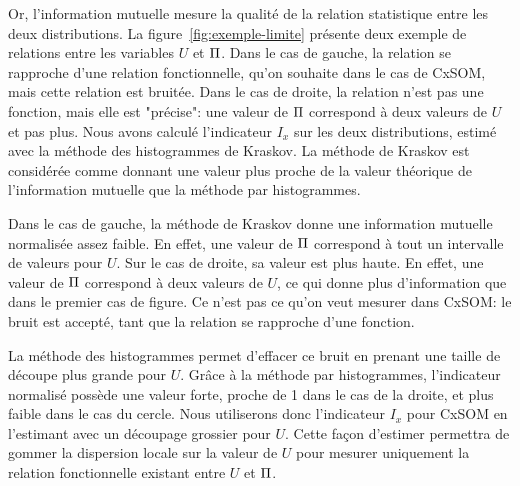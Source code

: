 Or, l'information mutuelle mesure la qualité de la relation statistique entre les deux distributions. La figure~\ref{fig:exemple-limite} présente deux exemple de relations entre les variables $U$ et $\Pi$. Dans le cas de gauche, la relation se rapproche d'une relation fonctionnelle, qu'on souhaite dans le cas de CxSOM, mais cette relation est bruitée. Dans le cas de droite, la relation n'est pas une fonction, mais elle est "précise": une valeur de $\Pi$ correspond à deux valeurs de $U$ et pas plus.
Nous avons calculé l'indicateur $I_x$ sur les deux distributions, estimé avec la méthode des histogrammes de Kraskov. La méthode de Kraskov est considérée comme donnant une valeur plus proche de la valeur théorique de l'information mutuelle que la méthode par histogrammes. 

Dans le cas de gauche, la méthode de Kraskov donne une information mutuelle normalisée assez faible. En effet, une valeur de $\Pi$ correspond à tout un intervalle de valeurs pour $U$. Sur le cas de droite, sa valeur est plus haute. En effet, une valeur de $\Pi$ correspond à deux valeurs de $U$, ce qui donne plus d'information que dans le premier cas de figure. Ce n'est pas ce qu'on veut mesurer dans CxSOM: le bruit est accepté, tant que la relation se rapproche d'une fonction.


La méthode des histogrammes permet d'effacer ce bruit en prenant une taille de découpe plus grande pour $U$. Grâce à la méthode par histogrammes, l'indicateur normalisé possède une valeur forte, proche de 1 dans le cas de la droite, et plus faible dans le cas du cercle.
Nous utiliserons donc l'indicateur $I_x$ pour CxSOM en l'estimant avec un découpage grossier pour $U$. Cette façon d'estimer permettra de gommer la dispersion locale sur la valeur de $U$ pour mesurer uniquement la relation fonctionnelle existant entre $U$ et $\Pi$.

